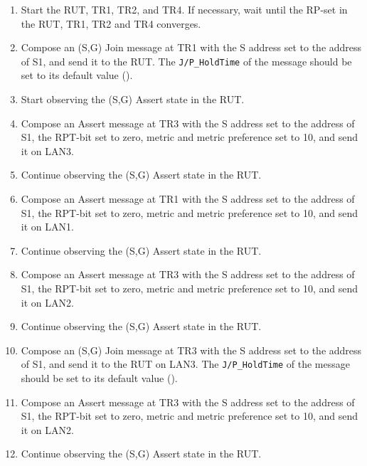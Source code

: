 \documentclass[11pt]{report}
\begin{document}
\begin{enumerate}

  \item Start the RUT, TR1, TR2, and TR4. If necessary, wait until the RP-set
  in the RUT, TR1, TR2 and TR4 converges.

  \item Compose an (S,G) Join message at TR1 with the S address set to the
  address of S1, and send it to the RUT.
  The \verb=J/P_HoldTime= of the message should be set to its default
  value ({\PimsmJPHoldTime}).

  \item Start observing the (S,G) Assert state in the RUT.

  \item Compose an Assert message at TR3 with the S address set to the
  address of S1, the RPT-bit set to zero, metric and metric preference set to
  10, and send it on LAN3.

  \item Continue observing the (S,G) Assert state in the RUT.

  \item Compose an Assert message at TR1 with the S address set to the
  address of S1, the RPT-bit set to zero, metric and metric preference set to
  10, and send it on LAN1.

  \item Continue observing the (S,G) Assert state in the RUT.

  \item Compose an Assert message at TR3 with the S address set to the
  address of S1, the RPT-bit set to zero, metric and metric preference set to
  10, and send it on LAN2.

  \item Continue observing the (S,G) Assert state in the RUT.

  \item Compose an (S,G) Join message at TR3 with the S address set to the
  address of S1, and send it to the RUT on LAN3.
  The \verb=J/P_HoldTime= of the message should be set to its default
  value ({\PimsmJPHoldTime}).

  \item Compose an Assert message at TR3 with the S address set to the
  address of S1, the RPT-bit set to zero, metric and metric preference set to
  10, and send it on LAN2.

  \item Continue observing the (S,G) Assert state in the RUT.

\end{enumerate}
\end{document}
